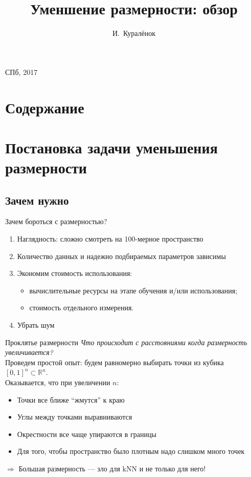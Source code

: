 \documentclass[14pt, fleqn, xcolor={dvipsnames, table}]{beamer}
\title{Уменшение размерности: обзор\\\small{}}
\author[]{\small{%
И.~Куралёнок}}
\date{}
\begin{document}
\begin{frame}
\maketitle
\small
\begin{center}
\vspace{-60pt}
\normalsize
\vspace{80pt}
\footnotesize СПб, 2017
\end{center}
\end{frame}

\section{Содержание}
\section{Постановка задачи уменьшения размерности}
\subsection{Зачем нужно}
\begin{frame}{Зачем бороться с размерностью?}
\begin{enumerate}
  \item Наглядность: сложно смотреть на 100-мерное пространство
  \item Количество данных и надежно подбираемых параметров зависимы
  \item Экономим стоимость использования:
  \begin{itemize}
    \item вычислительные ресурсы на этапе обучения и/или использования;
    \item стоимость отдельного измерения.
  \end{itemize}
  \item Убрать шум
\end{enumerate}
\end{frame}

\begin{frame}{Проклятье размерности}
\small
\emph{Что происходит с расстояниями когда размерность увеличивается?} \\
Проведем простой опыт: будем равномерно выбирать точки из кубика $[0, 1]^n \subset \mathbb{R}^n$. \\
Оказывается, что при увеличении $n$:
\begin{itemize}
  \item Точки все ближе “жмутся” к краю
  \item Углы между точками выравниваются
  \item Окрестности все чаще упираются в границы
  \item Для того, чтобы пространство было плотным надо слишком много точек
\end{itemize}
$\Rightarrow$ Большая размерность — зло для kNN и не только для него!
\end{frame}
\end{document}
